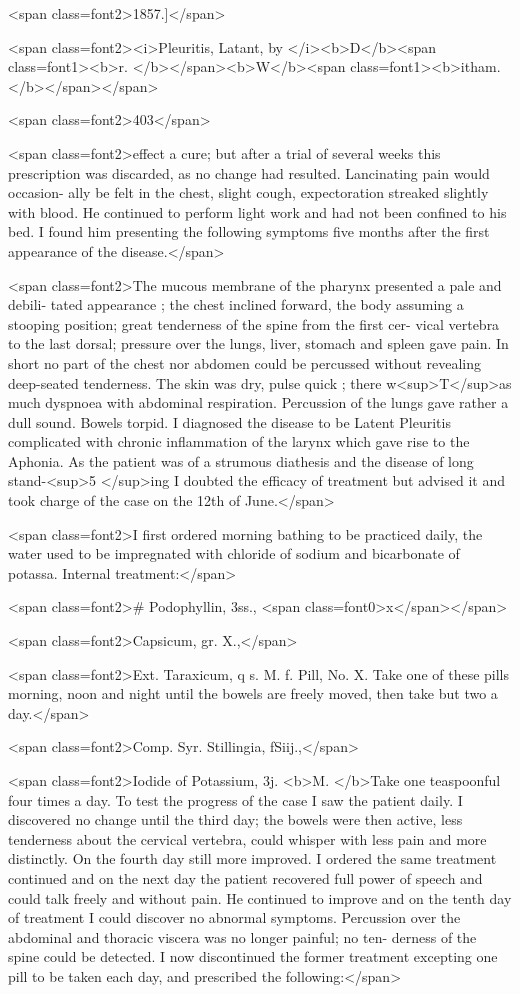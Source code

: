 <span class=font2>1857.]</span>

<span class=font2><i>Pleuritis, Latant, by </i><b>D</b><span class=font1><b>r. </b></span><b>W</b><span class=font1><b>itham.</b></span></span>

<span class=font2>403</span>

<span class=font2>effect a cure; but after a trial of several weeks this prescription was
discarded, as no change had resulted. Lancinating pain would occasion-
ally be felt in the chest, slight cough, expectoration streaked slightly
with blood. He continued to perform light work and had not been
confined to his bed. I found him presenting the following symptoms
five months after the first appearance of the disease.</span>

<span class=font2>The mucous membrane of the pharynx presented a pale and debili-
tated appearance ; the chest inclined forward, the body assuming a
stooping position; great tenderness of the spine from the first cer-
vical vertebra to the last dorsal; pressure over the lungs, liver, stomach
and spleen gave pain. In short no part of the chest nor abdomen
could be percussed without revealing deep-seated tenderness. The
skin was dry, pulse quick ; there w<sup>T</sup>as much dyspnoea with abdominal
respiration. Percussion of the lungs gave rather a dull sound. Bowels
torpid. I diagnosed the disease to be Latent Pleuritis complicated
with chronic inflammation of the larynx which gave rise to the Aphonia.
As the patient was of a strumous diathesis and the disease of long stand-<sup>5
</sup>ing I doubted the efficacy of treatment but advised it and took charge
of the case on the 12th of June.</span>

<span class=font2>I first ordered morning bathing to be practiced daily, the water used
to be impregnated with chloride of sodium and bicarbonate of potassa.
Internal treatment:</span>

<span class=font2>#   Podophyllin, 3ss., <span class=font0>x</span></span>

<span class=font2>Capsicum, gr. X.,</span>

<span class=font2>Ext. Taraxicum, q s.
M. f. Pill, No. X.   Take one of these pills morning, noon and night
until the bowels are freely moved, then take but two a day.</span>

<span class=font2>Comp. Syr. Stillingia, fSiij.,</span>

<span class=font2>Iodide of Potassium, 3j.
<b>M. </b>Take one teaspoonful four times a day. To test the progress of
the case I saw the patient daily. I discovered no change until the third
day; the bowels were then active, less tenderness about the cervical
vertebra, could whisper with less pain and more distinctly. On the
fourth day still more improved. I ordered the same treatment continued
and on the next day the patient recovered full power of speech and could
talk freely and without pain. He continued to improve and on the tenth
day of treatment I could discover no abnormal symptoms. Percussion
over the abdominal and thoracic viscera was no longer painful; no ten-
derness of the spine could be detected. I now discontinued the former
treatment excepting one pill to be taken each day, and prescribed the
following:</span>\endinput
